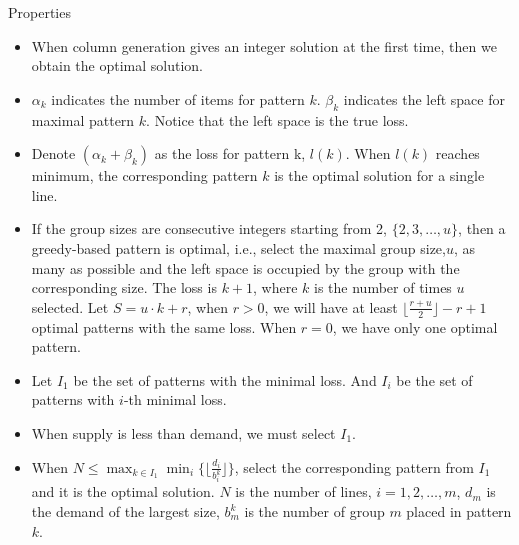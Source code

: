     \begin{frame}{Properties}
      \begin{itemize}
        \item When column generation gives an integer solution at the first time, then we obtain the optimal solution.
        \item $\alpha_k$ indicates the number of items for pattern $k$. $\beta_k$ indicates the left space for maximal pattern $k$. Notice that the left space is the true loss.
        \item Denote $(\alpha_k + \beta_k)$ as the loss for pattern k, $l(k)$. When $l(k)$ reaches minimum, the corresponding pattern $k$ is the optimal solution for a single line.
        \item If the group sizes are consecutive integers starting from 2, $\{2,3,\ldots,u\}$, then a greedy-based pattern is optimal, i.e., select the maximal group size,$u$, as many as possible and the left space is occupied by the group with the corresponding size. The loss is $k+1$, where $k$ is the number of times $u$ selected. Let $S = u\cdot k + r$, when $r>0$, we will have at least $\lfloor \frac{r+u}{2} \rfloor -r +1$ optimal patterns with the same loss. When $r =0$, we have only one optimal pattern.
      \end{itemize}
    \end{frame}

    \begin{frame}
      \begin{itemize}
        \item Let $I_1$ be the set of patterns with the minimal loss. And $I_i$ be the set of patterns with $i$-th minimal loss.
        \item When supply is less than demand, we must select $I_1$.
        \item When $N \leq \max_{k\in I_1} \min_{i} \{\lfloor \frac{d_i}{b_i^k}\rfloor\}$, select the corresponding pattern from $I_1$ and it is the optimal solution.
        $N$ is the number of lines, $i = 1,2,\ldots, m$, $d_m$ is the demand of the largest size, $b_m^k$ is the number of group $m$ placed in pattern $k$.

      \end{itemize}
    \end{frame}

